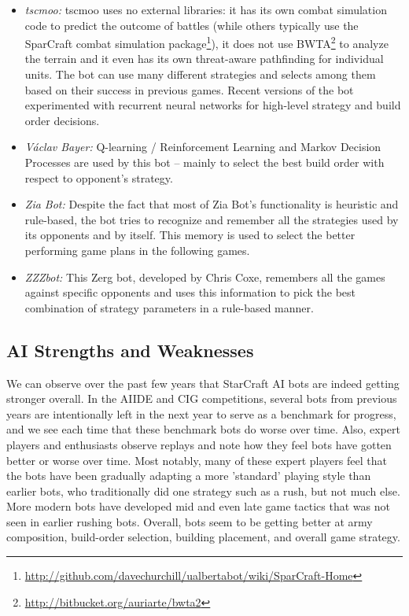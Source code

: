 \begin{itemize}
  \item {\em tscmoo:} tscmoo uses no external libraries: it has its own combat simulation code to predict the outcome of battles (while others typically use the SparCraft combat simulation package\footnote{\url{http://github.com/davechurchill/ualbertabot/wiki/SparCraft-Home}}), it does not use BWTA\footnote{\url{http://bitbucket.org/auriarte/bwta2}} to analyze the terrain and it even has its own threat-aware pathfinding for individual units. The bot can use many different strategies and selects among them based on their success in previous games. Recent versions of the bot experimented with recurrent neural networks for high-level strategy and build order decisions.
  
  \item {\em V\'{a}clav Bayer:} Q-learning / Reinforcement Learning and Markov Decision Processes are used by this bot -- mainly to select the best build order with respect to opponent's strategy.
  
  \item {\em Zia Bot:} Despite the fact that most of Zia Bot's functionality is heuristic and rule-based, the bot tries to recognize and remember all the strategies used by its opponents and by itself. This memory is used to select the better performing game plans in the following games.
  
  \item {\em ZZZbot:} This Zerg bot, developed by Chris Coxe, remembers all the games against specific opponents and uses this information to pick the best combination of strategy parameters in a rule-based manner.   

\end{itemize}

\subsection{AI Strengths and Weaknesses}

We can observe over the past few years that StarCraft AI bots are indeed getting stronger overall. In the AIIDE and CIG competitions, several bots from previous years are intentionally left in the next year to serve as a benchmark for progress, and we see each time that these benchmark bots do worse over time. Also, expert players and enthusiasts observe replays and note how they feel bots have gotten better or worse over time. Most notably, many of these expert players feel that the bots have been gradually adapting a more 'standard' playing style than earlier bots, who traditionally did one strategy such as a rush, but not much else. More modern bots have developed mid and even late game tactics that was not seen in earlier rushing bots. Overall, bots seem to be getting better at army composition, build-order selection, building placement, and overall game strategy. 

